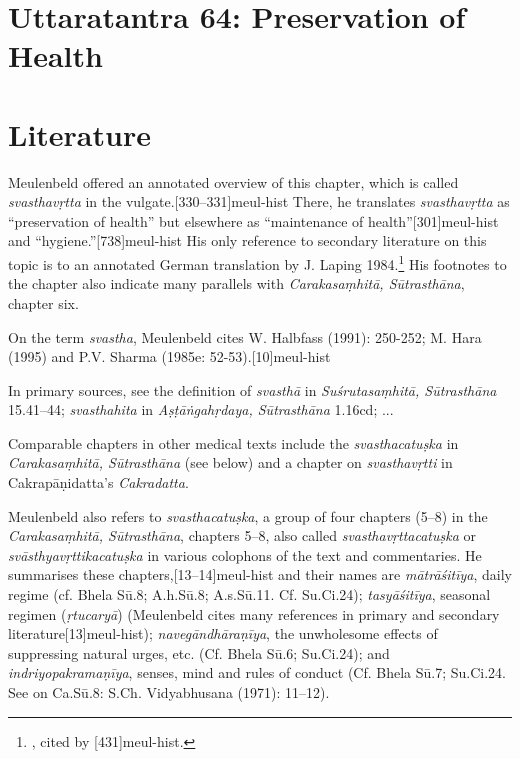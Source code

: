 
\section{Uttaratantra 64: Preservation of Health}%

\section{Literature}

Meulenbeld offered an annotated overview of this chapter, which is called
\emph{svasthavṛtta} in the vulgate.[330--331]{meul-hist} There,
he translates \emph{svasthavṛtta} as ``preservation of health'' but elsewhere
as ``maintenance of health''[301]{meul-hist} and
``hygiene.''[738]{meul-hist} His only reference to secondary
literature on this topic is to an annotated German translation by J. Laping
1984.\footnote{\cite{lapi-1984}, cited by [431]{meul-hist}.} His
footnotes to the chapter also indicate
many parallels with \emph{Carakasaṃhitā, Sūtrasthāna}, chapter six.

On the term \emph{svastha}, Meulenbeld cites W. Halbfass (1991): 250-252; M.
Hara (1995) and P.V. Sharma (1985e: 52-53).[10]{meul-hist}

In primary sources, see the definition of \emph{svasthā} in
\emph{Suśrutasaṃhitā, Sūtrasthāna} 15.41--44; \emph{svasthahita} in
\emph{Aṣṭāṅgahṛdaya, Sūtrasthāna} 1.16cd; ...

Comparable chapters in other medical texts include the \emph{svasthacatuṣka}
in \emph{Carakasaṃhitā, Sūtrasthāna} (see below) and a chapter on
\emph{svasthavṛtti} in Cakrapāṇidatta's \emph{Cakradatta}.

Meulenbeld also refers to \emph{svasthacatuṣka}, a group of four chapters
(5--8) in the \emph{Carakasaṃhitā, Sūtrasthāna}, chapters 5–8, also called
\emph{svasthavṛttacatuṣka} or \emph{svāsthyavṛttikacatuṣka} in various
colophons of the text and commentaries. He summarises these
chapters,[13--14]{meul-hist} and their names are
\emph{mātrāśitīya}, daily regime (cf. Bhela Sū.8; A.h.Sū.8; A.s.Sū.11. Cf.
Su.Ci.24); \emph{tasyāśitīya}, seasonal regimen (\emph{ṛtucaryā})
(Meulenbeld cites many references in primary and secondary
literature[13]{meul-hist}); \emph{navegāndhāraṇīya}, the
unwholesome effects of suppressing natural urges, etc. (Cf. Bhela Sū.6;
Su.Ci.24); and \emph{indriyopakramaṇīya}, senses, mind and rules of conduct
(Cf. Bhela Sū.7; Su.Ci.24. See on Ca.Sū.8: S.Ch. Vidyabhusana (1971): 11--12).

